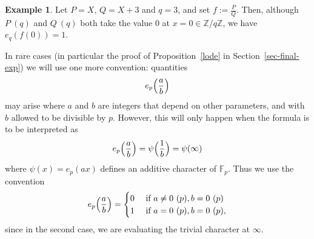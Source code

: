 \documentclass[12pt,a4paper,reqno]{amsart}
\numberwithin{equation}{section}
\theoremstyle{plain}
\theoremstyle{definition}
\newtheorem{example}[theorem]{Example}
\newcommand\F{\mathbb{F}}
\newcommand\Z{\mathbb{Z}}
\newcommand\Fp{\F_{p}}
\begin{document}
\begin{example}
Let $P=X$, $Q=X+3$ and $q=3$, and set $f := \frac{P}{Q}$. Then, although $P\ (q)$ and $Q\ (q)$
both take the value $0$ at $x=0\in\Z/q\Z$, we have $e_q(f(0))=1$.
\end{example}

In rare cases (in particular the proof of Proposition~\ref{lode} in
Section~\ref{sec-final-exp}) we will use one more convention:
quantities 
$$
e_p\Bigl(\frac{a}{b}\Bigr)
$$
may arise where $a$ and $b$ are integers that depend on other
parameters, and with $b$ allowed to be divisible by $p$.
However, this will only happen when the formula is to be interpreted as
$$
e_p\Bigl(\frac{a}{b}\Bigr) =\psi\Bigl(\frac{1}{b}\Bigr)=\psi(\infty)
$$
where $\psi(x)=e_p(ax)$ defines an additive character of $\Fp$. Thus
we use the convention
$$
e_p\Bigl(\frac{a}{b}\Bigr)=\begin{cases}
0&\text{ if } a\neq 0\ (p), b = 0\ (p)\\
1&\text{ if } a=0\ (p), b = 0\ (p),
\end{cases}
$$
since in the second case, we are evaluating the trivial character at
$\infty$. 
\par
\end{document}
